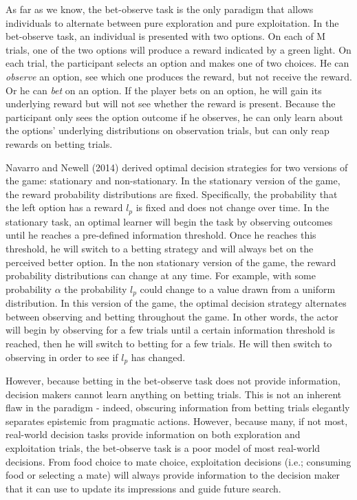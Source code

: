 \documentclass[a4paper,doc,natbib,floatsintext]{apa6}\usepackage[]{graphicx}\usepackage[]{color}
\begin{document}
As far as we know, the bet-observe task is the only paradigm that allows individuals to alternate between pure exploration and pure exploitation. In the bet-observe task, an individual is presented with two options. On each of M trials, one of the two options will produce a reward indicated by a green light. On each trial, the participant selects an option and makes one of two choices. He can \textit{observe} an option, see which one produces the reward, but not receive the reward. Or he can \textit{bet} on an option. If the player bets on an option, he will gain its underlying reward but will not see whether the reward is present. Because the participant only sees the option outcome if he observes, he can only learn about the options' underlying distributions on observation trials, but can only reap rewards on betting trials.

Navarro and Newell (2014) derived optimal decision strategies for two versions of the game: stationary and non-stationary. In the stationary version of the game, the reward probability distributions are fixed. Specifically, the probability that the left option has a reward $l_{p}$ is fixed and does not change over time. In the stationary task, an optimal learner will begin the task by observing outcomes until he reaches a pre-defined information threshold. Once he reaches this threshold, he will switch to a betting strategy and will always bet on the perceived better option. In the non stationary version of the game, the reward probability distributions can change at any time. For example, with some probability $\alpha$ the probability $l_{p}$ could change to a value drawn from a uniform distribution. In this version of the game, the optimal decision strategy alternates between observing and betting throughout the game. In other words, the actor will begin by observing for a few trials until a certain information threshold is reached, then he will switch to betting for a few trials. He will then switch to observing in order to see if $l_{p}$ has changed.

However, because betting in the bet-observe task does not provide information, decision makers cannot learn anything on betting trials. This is not an inherent flaw in the paradigm - indeed, obscuring information from betting trials elegantly separates epistemic from pragmatic actions. However, because many, if not most, real-world decision tasks provide information on both exploration and exploitation trials, the bet-observe task is a poor model of most real-world decisions. From food choice to mate choice, exploitation decisions (i.e.; consuming food or selecting a mate) will always provide information to the decision maker that it can use to update its impressions and guide future search. 
\end{document}
